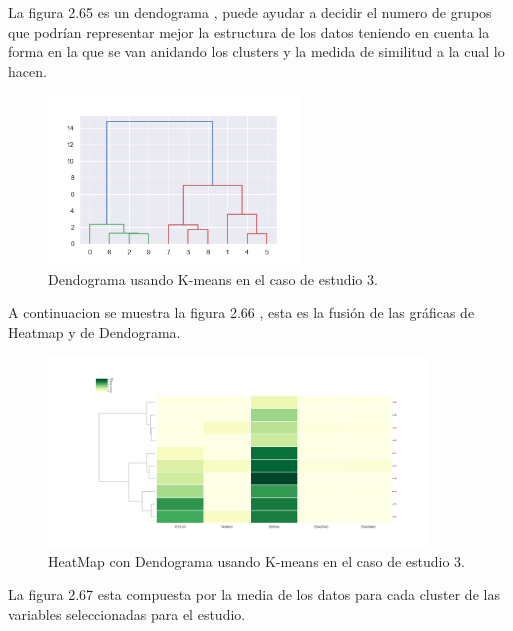 
	La figura 2.65 es un dendograma , puede ayudar a decidir el numero de grupos que podrían representar
	mejor la estructura de los datos teniendo en cuenta la forma en la que se van anidando los clusters
	y la medida de similitud a la cual lo hacen. \\

	\begin{figure}[htb]
		\centering
		\includegraphics[width=0.6\textwidth]{./imagenes/caso3/dendograma_caso3_K-means}
		\caption{Dendograma usando K-means en el caso de estudio 3.} \label{fig:1}
	\end{figure}

	A continuacion se muestra la figura 2.66 , esta es la fusión de las gráficas de 
	Heatmap y de Dendograma.  \\

	\begin{figure}[htb]
		\centering
		\includegraphics[width=0.9\textwidth]{./imagenes/caso3/heatmapcondendograma_caso3_K-means}
		\caption{HeatMap con Dendograma usando K-means en el caso de estudio 3.} \label{fig:1}
	\end{figure}

	La figura 2.67 esta compuesta por la media de los datos para cada cluster de las variables seleccionadas
	para el estudio. \\ 

